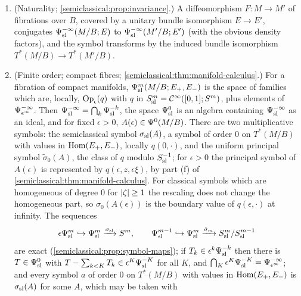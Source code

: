\begin{enumerate}[label=(S\arabic*),leftmargin=*]
  some quantization of $q$, not about a given $A$: a given family with
  $\sigsl(A)=q$ need not be within $\Psiinf$ of such a choice (for instance
  $A=\epsilon A_1$ with $\sigsl(A_1)$ supported away from $\varpi^{-1}(K)$ has
  symbol $0$), and only fresh choices are used below. All of this holds with smooth
  dependence on additional parameters (\cref{semiclassical:rem:parameters}).
\item\label{scindex:S-invariance} (Naturality;
  \cref{semiclassical:prop:invariance}.) A diffeomorphism $F:M\to M'$ of
  fibrations over $B$, covered by a unitary bundle isomorphism $E\to E'$,
  conjugates $\Psi^{-\infty}_{\mathrm{sl}}(M/B;E)$ to $\Psi^{-\infty}_{\mathrm{sl}}(M'/B;E')$ (with the
  obvious density factors), and the symbol transforms by the induced bundle
  isomorphism $T^*(M/B)\to T^*(M'/B)$.
\item\label{scindex:S-order0} (Finite order; compact fibres;
  \cref{semiclassical:thm:manifold-calculus}.) For a fibration of compact
  manifolds, $\Psi^{m}_{\mathrm{sl}}(M/B;E_+,E_-)$ is the space of families which are,
  locally, $\operatorname{Op}_\epsilon(q)$ with $q$ in $S^{m}_{\mathrm{sl}}=\mathcal{C}^\infty([0,1];S^{m})$, plus elements
  of $\Psiinf$. Then $\Psi^{-\infty}_{\mathrm{sl}}=\bigcap_k\Psi^{-k}_{\mathrm{sl}}$, the space
  $\Psi^{0}_{\mathrm{sl}}$ is an algebra
  containing $\Psi^{-\infty}_{\mathrm{sl}}$ as an ideal, and for fixed $\epsilon>0$,
  $A(\epsilon)\in\Psi^{0}(M/B)$. There are two multiplicative symbols: the
  semiclassical symbol $\sigma_{\mathrm{sl}}(A)$, a symbol of order $0$ on $T^*(M/B)$ with
  values in $\operatorname{Hom}(E_+,E_-)$, locally $q(0,\cdot)$, and the uniform principal symbol $\tilde\sigma_0(A)$, the class of
  $q$ modulo $S^{-1}_{\mathrm{sl}}$; for $\epsilon>0$ the principal symbol of $A(\epsilon)$ is
  represented by $q(\epsilon,z,\epsilon\xi)$, by part (f) of
  \cref{semiclassical:thm:manifold-calculus}. For classical symbols which are
  homogeneous of degree $0$ for $\lvert \zeta\rvert\ge1$ the rescaling does not change the
  homogeneous part, so $\sigma_0(A(\epsilon))$ is the boundary value of
  $q(\epsilon,\cdot)$ at infinity. The sequences
  \begin{equation*}
    \epsilon\Psi^{m}_{\mathrm{sl}}\hookrightarrow\Psi^{m}_{\mathrm{sl}}\xrightarrow{\sigma_{\mathrm{sl}}}S^{m},\qquad
    \Psi^{m-1}_{\mathrm{sl}}\hookrightarrow\Psi^{m}_{\mathrm{sl}}\xrightarrow{\tilde\sigma_m}S^{m}_{\mathrm{sl}}/S^{m-1}_{\mathrm{sl}}
  \end{equation*}
  are exact (\cref{semiclassical:prop:symbol-maps}); if $T_k\in
  \epsilon^k\Psi^{-k}_{\mathrm{sl}}$ then there is $T\in\Psi^{0}_{\mathrm{sl}}$ with
  $T-\sum_{k<K}T_k\in\epsilon^K\Psi^{-K}_{\mathrm{sl}}$ for all $K$, and
  $\bigcap_K\epsilon^K\Psi^{-K}_{\mathrm{sl}}=\Psi^{-\infty}_{\epsilon^\infty}$; and every symbol $a$ of order $0$ on $T^*(M/B)$ with values in
  $\operatorname{Hom}(E_+,E_-)$ is $\sigma_{\mathrm{sl}}(A)$ for some $A$, which may be taken with

\end{enumerate}
